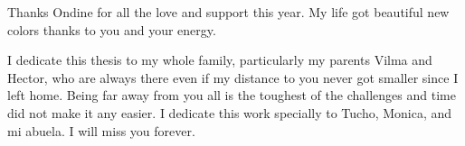 Thanks Ondine for all the love and support this year. 
My life got beautiful new colors thanks to you and your energy. 

I dedicate this thesis to my whole family, particularly my parents Vilma and Hector, who are always there even if
my distance to you never got smaller since I left home. Being far away from you all is the toughest of the challenges
and time did not make it any easier. 
I dedicate this work specially to Tucho, Monica, and mi abuela. 
I will miss you forever.  
